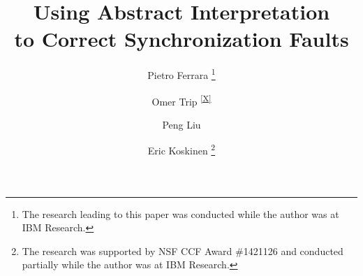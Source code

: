 \documentclass{llncs}
\newcommand{\repthanks}[1]{\textsuperscript{\ref{#1}}}
\begin{document}
\title{Using Abstract Interpretation\\
  to Correct Synchronization Faults}




\author{
  Pietro Ferrara \thanks{The research leading to this paper was conducted while the author was at IBM Research.\protect\label{X}}
  \and Omer Trip \repthanks{X}
  \and Peng Liu 
  \and Eric Koskinen \thanks{The research was supported by NSF CCF Award \#1421126 and conducted partially while the author was at IBM Research.}
}
\maketitle

\newcommand\ignore[1]{}
\newcommand{\pengtodo}[1]{{\bf #1}}
\newcommand{\pietrotodo}[1]{{\bf #1}}

\begin{abstract}
  
\end{abstract}













\vfill
\newpage
\appendix

\end{document}
